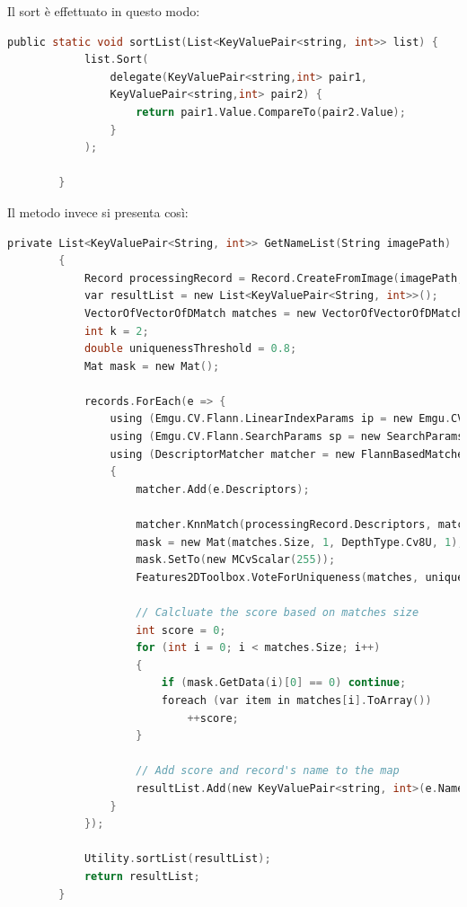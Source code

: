 \documentclass[twoside]{supsistudent}
\begin{document}
Il sort è effettuato in questo modo:

\begin{lstlisting}[language=C]
  public static void sortList(List<KeyValuePair<string, int>> list) {
            list.Sort(
                delegate(KeyValuePair<string,int> pair1,
                KeyValuePair<string,int> pair2) {
                    return pair1.Value.CompareTo(pair2.Value);
                }
            );
          
        }
\end{lstlisting}

Il metodo invece si presenta così:

\begin{lstlisting}[language=C]
 private List<KeyValuePair<String, int>> GetNameList(String imagePath)
        {
            Record processingRecord = Record.CreateFromImage(imagePath, "");
            var resultList = new List<KeyValuePair<String, int>>();
            VectorOfVectorOfDMatch matches = new VectorOfVectorOfDMatch();
            int k = 2;
            double uniquenessThreshold = 0.8;
            Mat mask = new Mat();

            records.ForEach(e => {
                using (Emgu.CV.Flann.LinearIndexParams ip = new Emgu.CV.Flann.LinearIndexParams())
                using (Emgu.CV.Flann.SearchParams sp = new SearchParams())
                using (DescriptorMatcher matcher = new FlannBasedMatcher(ip, sp))
                {
                    matcher.Add(e.Descriptors);

                    matcher.KnnMatch(processingRecord.Descriptors, matches, k, null);
                    mask = new Mat(matches.Size, 1, DepthType.Cv8U, 1);
                    mask.SetTo(new MCvScalar(255));
                    Features2DToolbox.VoteForUniqueness(matches, uniquenessThreshold, mask);

                    // Calcluate the score based on matches size
                    int score = 0;
                    for (int i = 0; i < matches.Size; i++)
                    {
                        if (mask.GetData(i)[0] == 0) continue;
                        foreach (var item in matches[i].ToArray())
                            ++score;
                    }

                    // Add score and record's name to the map
                    resultList.Add(new KeyValuePair<string, int>(e.Name, score));
                }
            });

            Utility.sortList(resultList);
            return resultList;
        }
\end{lstlisting}
\end{document}
